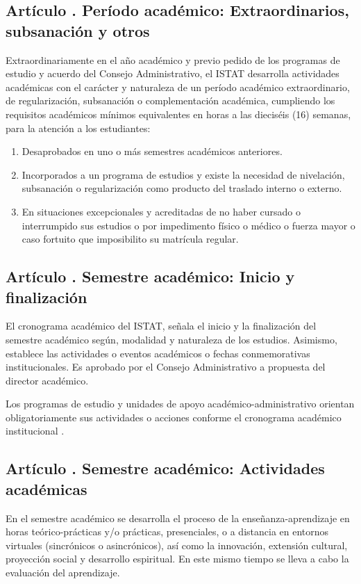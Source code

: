 \subsection{Artículo . Período académico: Extraordinarios, subsanación y otros}
\addtocounter{ns}{1}
Extraordinariamente en el año académico y previo pedido de los programas de estudio y acuerdo del Consejo Administrativo, el ISTAT desarrolla actividades académicas con el carácter y naturaleza de un período académico extraordinario, de regularización, subsanación o complementación académica, cumpliendo los requisitos académicos mínimos equivalentes en horas a las dieciséis (16) semanas, para la atención a los estudiantes: 
\begin{enumerate}
\item Desaprobados en uno o más semestres académicos anteriores. 
\item Incorporados a un programa de estudios y existe la necesidad de nivelación, subsanación o regularización como producto del traslado interno o externo. 
\item En situaciones excepcionales y acreditadas de no haber cursado o interrumpido sus estudios o por impedimento físico o médico o fuerza mayor o caso fortuito que imposibilito su matrícula regular.  
\end{enumerate}
\subsection{Artículo . Semestre académico: Inicio y finalización}
\addtocounter{ns}{1}
El cronograma académico del ISTAT, señala el inicio y la finalización del semestre académico según, modalidad y naturaleza de los estudios. Asimismo, establece las actividades o eventos académicos o fechas conmemorativas institucionales. Es aprobado por el Consejo Administrativo a propuesta del director académico.  

Los programas de estudio y unidades de apoyo académico-administrativo orientan obligatoriamente sus actividades o acciones conforme el cronograma académico institucional . 
\subsection{Artículo . Semestre académico: Actividades académicas}
\addtocounter{ns}{1}
En el semestre académico se desarrolla el proceso de la enseñanza-aprendizaje en horas teórico-prácticas y/o prácticas, presenciales, o a distancia en entornos virtuales (sincrónicos o asincrónicos), así como la innovación, extensión cultural, proyección social y desarrollo espiritual. En este mismo tiempo se lleva a cabo la evaluación del aprendizaje. 

